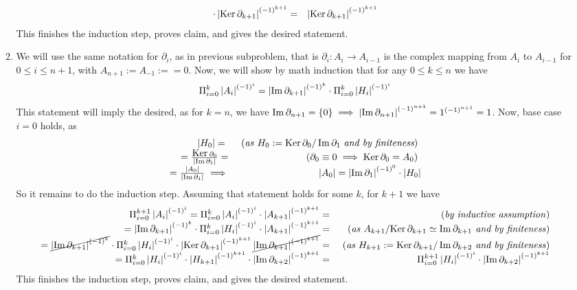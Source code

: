 \documentclass[8pt,fleqn]{article} %
\newcommand{\myexplain}[1]{\mbox{ (\textit{#1})}}
\begin{document}
\begin{enumerate}[label=\bfseries Problem \arabic*.]
\begin{enumerate}[label=(\arabic*).]
\[\begin{array}{rr}
				\cdot\left|\mbox{\normalfont Ker\,}\partial_{{k+1}}\right|^{(-1)^{k+1}}=
			&\left|\mbox{\normalfont Ker\,}\partial_{{k+1}}\right|^{(-1)^{k+1}}
		\end{array}\]
		This finishes the induction step, proves claim, and gives the desired statement.
			\item We will use the same notation for $\partial_i$, as in previous subproblem, that is $\partial_i:A_i\to
				A_{i-1}$ is the complex mapping from $A_i$ to $A_{i-1}$ for $0\leq i\leq n+1$, with $A_{n+1}:=A_{-1}:=
				=0$. Now, we will show by math induction that for any $0\leq k\leq n$ we have
				\[\Pi_{i=0}^k\left|A_i\right|^{(-1)^i}=\left|\operatorname{Im}\partial_{k+1}\right|^{(-1)^{k}}\cdot
				\Pi_{i=0}^k\left|H_i\right|^{(-1)^i}\]
				This statement will imply the desired, as for $k=n$, we have $\operatorname{Im}\partial_{n+1}=\left\{0\right\}\implies
				\left|\operatorname{Im}\partial_{n+1}\right|^{(-1)^{n+1}}=1^{(-1)^{n+1}}=1$. Now, base case $i=0$ holds, as
		\[\begin{array}{rr}
			\left|H_0\right|=\
			&\mbox{ (\textit{as} $H_0:=\mbox{\normalfont Ker\,}\partial_0/\operatorname{Im}\partial_{1}$ {\it and by finiteness}) }\\
			=\frac{\mbox{\normalfont Ker\,}\partial_0}{\left|\operatorname{Im}\partial_1\right|}=
			&\mbox{ ({$\partial_0\equiv0\implies\mbox{\normalfont Ker\,}\partial_0=A_0$}) }\\
			=\frac{\left|A_0\right|}{\left|\operatorname{Im}\partial_1\right|}\implies&\left|A_0\right|=\left|\operatorname{Im}\partial_1\right|^{(-1)^0}\cdot\left|H_0\right|
		\end{array}\]
		So it remains to do the induction step. Assuming that statement holds for some $k$, for $k+1$ we have
		\noindent\[\begin{array}{rr}
		\Pi_{i=0}^{k+1}\myabs{A_i}^{(-1)^i}=\Pi_{i=0}^k\myabs{A_i}^{(-1)^i}\cdot\myabs{A_{k+1}}^{(-1)^{k+1}}=
		&\myexplain{by inductive assumption}\\
		=\myabs{\Im\partial_{k+1}}^{(-1)^{k}}\cdot\Pi_{i=0}^k\myabs{H_i}^{(-1)^i}\cdot\myabs{A_{k+1}}^{(-1)^{k+1}}=
		&\myexplain{as $A_{k+1}/\Ker\partial_{k+1}\simeq\Im\partial_{k+1}$ and by finiteness}\\
		=\cancel{\myabs{\Im\partial_{k+1}}^{(-1)^{k}}}
		\cdot\Pi_{i=0}^k\myabs{H_i}^{(-1)^i}\cdot\myabs{\Ker\partial_{k+1}}^{(-1)^{k+1}}
		\cancel{\myabs{\Im\partial_{k+1}}^{(-1)^{k+1}}}=
		&\myexplain{{as} $H_{k+1}:=\Ker\partial_{k+1}/\Im\partial_{k+2}$ {and by finiteness}}\\
		=\Pi_{i=0}^k\myabs{H_i}^{(-1)^i}\cdot\myabs{H_{k+1}}^{(-1)^{k+1}}\cdot\myabs{\Im\partial_{k+2}}^{(-1)^{k+1}}=
		&\Pi_{i=0}^{k+1}\myabs{H_i}^{(-1)^i}\cdot\myabs{\Im\partial_{k+2}}^{(-1)^{k+1}}\end{array}\]
		This finishes the induction step, proves claim, and gives the desired statement.

\end{enumerate}
\end{enumerate}
\end{document}
